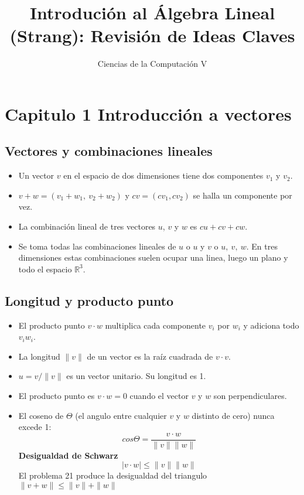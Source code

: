 \documentclass[]{article}
\title{Introduci\'on al \'Algebra Lineal (Strang): Revisi\'on de Ideas Claves}
\author{Ciencias de la Computaci\'on V}
\begin{document}
	
\maketitle

\section{Capitulo 1 Introducci\'on a vectores}

\subsection{Vectores y combinaciones lineales}

\begin{itemize}
	
	\item Un vector $ v $ en el espacio de dos dimensiones tiene dos componentes $ v_{1} $ y $ v_{2} $.  
	
	\item $ v+w=(v_{1}+w_{1},\ v_{2}+w_{2}) $ y $ cv=(cv_{1}, cv_{2}) $  se halla un componente por vez. 
	
	\item La combinación lineal de tres vectores $ u $, $ v $ y $ w $ es $ cu+cv+cw $.
	
	\item Se toma todas las combinaciones lineales de $ u $ o $ u $ y $ v $ o $ u,\ v,\ w $. En tres dimensiones estas combinaciones suelen ocupar una linea, luego un plano y todo el espacio $ \mathbb{R}^{3} $.  
	
\end{itemize}

\subsection{Longitud y producto punto}

\begin{itemize}
	
	\item El producto punto $ v\cdot w $ multiplica cada componente $ v_{i} $ por $ w_{i} $ y adiciona todo $ v_{i}w_{i} $. 
	
	\item La longitud $ \| v \| $ de un vector es la ra\'iz cuadrada de $ v\cdot v $. 
	
	\item $ u=v/ \| v \| $ es un vector unitario. Su longitud es 1. 
	
	\item El producto punto es $ v\cdot w = 0 $ cuando el vector $ v $ y $ w $ son perpendiculares. 
	
	\item El coseno de $ \Theta $ (el angulo entre cualquier $ v $ y $ w $ distinto de cero) nunca excede 1: 
	\[
	cos \Theta = \frac{v\cdot w}{\| v\| \|w \|} 
	\] 
	\textbf{Desigualdad de Schwarz}
	\[
	|v\cdot w|\leq \| v\| \|w \|
	\]
	El problema 21 produce la desigualdad del triangulo  $ \| v + w \| \leq \| v\| + \|w \| $
	
\end{itemize}
\end{document}
